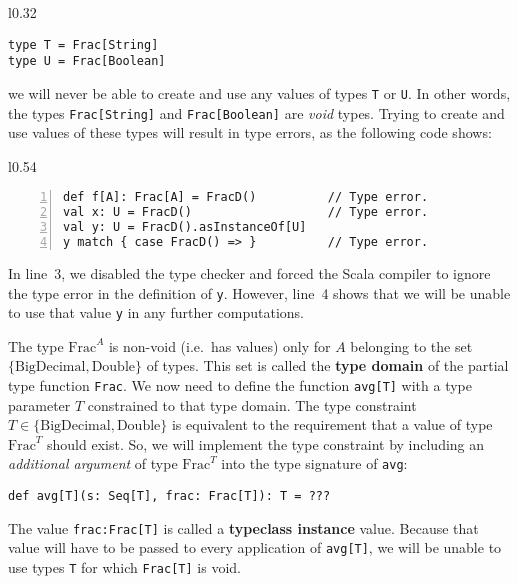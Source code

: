 \begin{wrapfigure}{l}{0.32\columnwidth}%
\vspace{-0.55\baselineskip}
\begin{lstlisting}
type T = Frac[String]
type U = Frac[Boolean]
\end{lstlisting}

\vspace{-1\baselineskip}
\end{wrapfigure}%

\noindent we will never be able to create and use any values of types
\lstinline!T! or \lstinline!U!. In other words, the types \lstinline!Frac[String]!
and \lstinline!Frac[Boolean]! are \emph{void} types.
Trying to create and use values of these types will result in type
errors, as the following code shows:

\begin{wrapfigure}{l}{0.54\columnwidth}%
\vspace{-0.5\baselineskip}
\begin{lstlisting}[numbers=left,numberstyle={\small}]
def f[A]: Frac[A] = FracD()          // Type error.
val x: U = FracD()                   // Type error.
val y: U = FracD().asInstanceOf[U]
y match { case FracD() => }          // Type error.
\end{lstlisting}

\vspace{-0.75\baselineskip}
\end{wrapfigure}%

\noindent In line~3, we disabled the type checker and forced the
Scala compiler to ignore the type error in the definition of \lstinline!y!.
However, line~4 shows that we will be unable to use that value \lstinline!y!
in any further computations.

The type $\text{Frac}^{A}$ is non-void (i.e.~has values) only for
$A$ belonging to the set $\{\text{BigDecimal},\text{Double}\}$ of
types. This set is called the \textbf{type domain}
of the partial type function \lstinline!Frac!. We now need to define
the function \lstinline!avg[T]! with a type parameter $T$ constrained
to that type domain. The type constraint $T\in\{\text{BigDecimal},\text{Double}\}$
is equivalent to the requirement that a value of type $\text{Frac}^{T}$
should exist. So, we will implement the type constraint by including
an \emph{additional argument} of type $\text{Frac}^{T}$ into the
type signature of \lstinline!avg!:
\begin{lstlisting}
def avg[T](s: Seq[T], frac: Frac[T]): T = ???
\end{lstlisting}
The value \lstinline!frac:Frac[T]! is called a \textbf{typeclass
instance} value. Because that value will have to be passed to every
application of \lstinline!avg[T]!, we will be unable to use types
\lstinline!T! for which \lstinline!Frac[T]! is void. 

